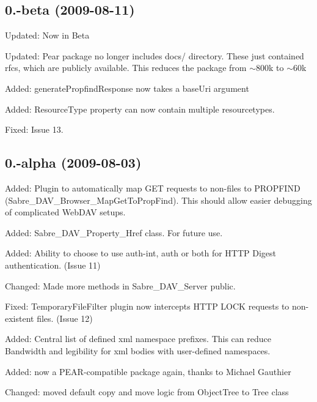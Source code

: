 \subsection*{0.-\/beta (2009-\/08-\/11) }


\begin{DoxyItemize}
\item Updated\+: Now in Beta
\item Updated\+: Pear package no longer includes docs/ directory. These just contained rfc\textquotesingle{}s, which are publicly available. This reduces the package from $\sim$800k to $\sim$60k
\item Added\+: generate\+Propfind\+Response now takes a base\+Uri argument
\item Added\+: Resource\+Type property can now contain multiple resourcetypes.
\item Fixed\+: Issue 13.
\end{DoxyItemize}

\subsection*{0.-\/alpha (2009-\/08-\/03) }


\begin{DoxyItemize}
\item Added\+: Plugin to automatically map G\+ET requests to non-\/files to P\+R\+O\+P\+F\+I\+ND (Sabre\+\_\+\+D\+A\+V\+\_\+\+Browser\+\_\+\+Map\+Get\+To\+Prop\+Find). This should allow easier debugging of complicated Web\+D\+AV setups.
\item Added\+: Sabre\+\_\+\+D\+A\+V\+\_\+\+Property\+\_\+\+Href class. For future use.
\item Added\+: Ability to choose to use auth-\/int, auth or both for H\+T\+TP Digest authentication. (Issue 11)
\item Changed\+: Made more methods in Sabre\+\_\+\+D\+A\+V\+\_\+\+Server public.
\item Fixed\+: Temporary\+File\+Filter plugin now intercepts H\+T\+TP L\+O\+CK requests to non-\/existent files. (Issue 12)
\item Added\+: Central list of defined xml namespace prefixes. This can reduce Bandwidth and legibility for xml bodies with user-\/defined namespaces.
\item Added\+: now a P\+E\+A\+R-\/compatible package again, thanks to Michael Gauthier
\item Changed\+: moved default copy and move logic from Object\+Tree to Tree class
\end{DoxyItemize}

